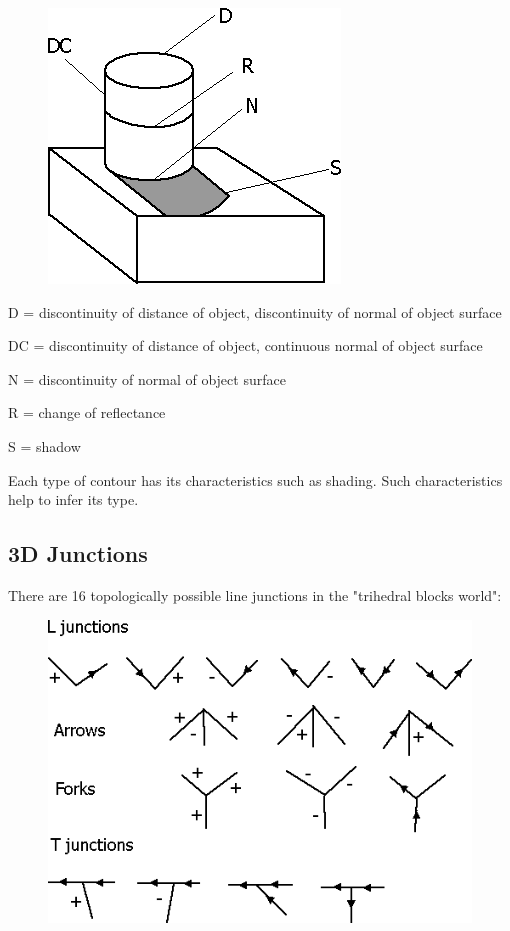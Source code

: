 \begin{figure}[H]
\centering
\includegraphics[scale=0.7, bb=0 0 293 276]{3DContours.PNG}
\end{figure}

D = discontinuity of distance of object, discontinuity of normal of object surface

DC = discontinuity of distance of object, continuous normal of object surface

N = discontinuity of normal of object surface 

R = change of reflectance

S = shadow

Each type of contour has its characteristics such as shading. Such characteristics help to infer its type.

\subsection{3D Junctions }

There are 16 topologically possible line junctions in the "trihedral blocks world":

\begin{figure}[H]
\centering
\includegraphics[scale=0.7, bb=0 0 499 357]{16Junctions.PNG}
\end{figure}

